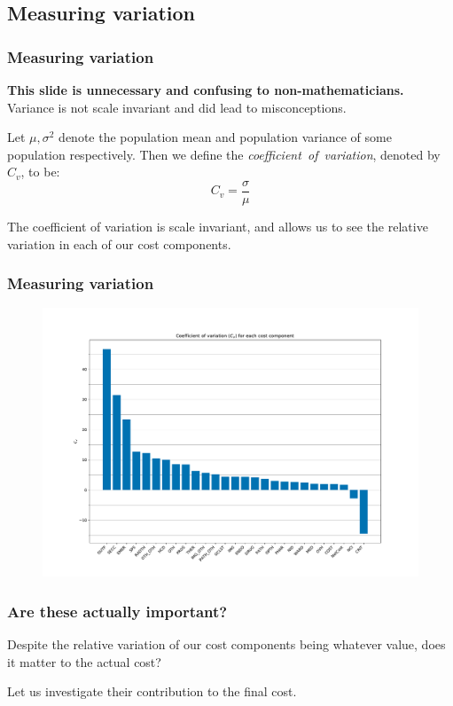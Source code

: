 \documentclass{beamer}
\begin{document}
\subsection{Measuring variation}

\begin{frame}
    \frametitle{Measuring variation}
    \textbf{This slide is unnecessary and confusing to non-mathematicians.}
    Variance is not scale invariant and did lead to misconceptions.

    \pause%
    \vspace{10pt}
    \begin{definition}
        Let \(\mu, \sigma^2\) denote the population mean and population variance
        of some population respectively. Then we define the
        \emph{coefficient~of~variation}, denoted by \(C_v\), to be:
        \[
            C_v = \frac{\sigma}{\mu}
        \]
    \end{definition}

    \pause%
    The coefficient of variation is scale invariant, and allows us to see the
    relative variation in each of our cost components.
\end{frame}

\begin{frame}
    \frametitle{Measuring variation}

    \begin{figure}
    \includegraphics[width=\linewidth]{./img/coeff_variation.pdf}
    \end{figure}
\end{frame}

\begin{frame}
    \frametitle{Are these actually important?}

    Despite the relative variation of our cost components being whatever value,
    does it matter to the actual cost?

    \vspace{10pt}
    Let us investigate their contribution to the final cost.
\end{frame}
\end{document}
